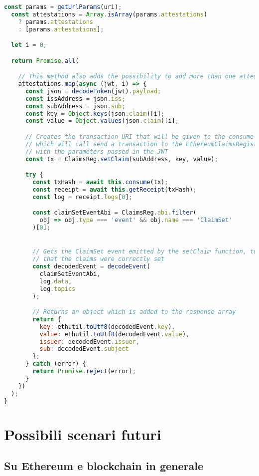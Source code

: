 \begin{itemize}
\begin{lstlisting}[language=JavaScript]
  const params = getUrlParams(uri);
  const attestations = Array.isArray(params.attestations)
    ? params.attestations
    : [params.attestations];

  let i = 0;

  return Promise.all(

    // This method also adds the possibility to add more than one attestation a time
    attestations.map(async (jwt, i) => {
      const json = decodeToken(jwt).payload;
      const issAddress = json.iss;
      const subAddress = json.sub;
      const key = Object.keys(json.claim)[i];
      const value = Object.values(json.claim)[i];

      // Creates the transaction URI that will be given to the consume function
      // which will call send a transaction to the EthereumClaimsRegistry contract on the private blockchain
      // with the parameters passed in the JWT
      const tx = ClaimsReg.setClaim(subAddress, key, value);

      try {
        const txHash = await this.consume(tx);
        const receipt = await this.getReceipt(txHash);
        const log = receipt.logs[0];

        const claimSetEventAbi = ClaimsReg.abi.filter(
          obj => obj.type === 'event' && obj.name === 'ClaimSet'
        )[0];


        // Gets the ClaimSet event emitted by the setClaim function, to give feedback to the NodeJS backend
        // that the claims were correctly set
        const decodedEvent = decodeEvent(
          claimSetEventAbi,
          log.data,
          log.topics
        );

        // Returns an object which is added to the response array
        return {
          key: ethutil.toUtf8(decodedEvent.key),
          value: ethutil.toUtf8(decodedEvent.value),
          issuer: decodedEvent.issuer,
          sub: decodedEvent.subject
        };
      } catch (error) {
        return Promise.reject(error);
      }
    })
  );
}
  \end{lstlisting}
\end{itemize}

\section{Possibili scenari futuri}

\subsection{Su Ethereum e blockchain in generale}

